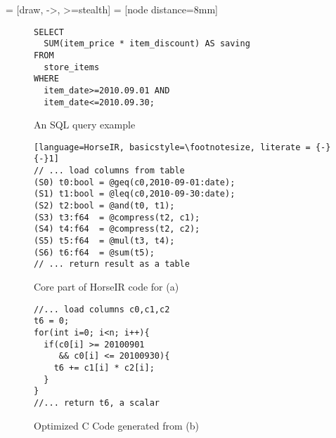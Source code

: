   = [draw, ->, >=stealth]
 = [node distance=8mm]

\begin{figure*}[htbp]

\begin{subfigure}[b]{.6\columnwidth}
\begin{lstlisting}[style=SQLStyle, basicstyle=\footnotesize]
SELECT
  SUM(item_price * item_discount) AS saving
FROM
  store_items
WHERE
  item_date>=2010.09.01 AND
  item_date<=2010.09.30;
\end{lstlisting}
\caption{An SQL query example} \label{fig:motivation_sql}
\end{subfigure}
\hfill
\begin{subfigure}[b]{.72\columnwidth}
\begin{lstlisting}[language=HorseIR, basicstyle=\footnotesize, literate = {-}{-}1]
// ... load columns from table
(S0) t0:bool = @geq(c0,2010-09-01:date);
(S1) t1:bool = @leq(c0,2010-09-30:date);
(S2) t2:bool = @and(t0, t1);
(S3) t3:f64  = @compress(t2, c1);
(S4) t4:f64  = @compress(t2, c2);
(S5) t5:f64  = @mul(t3, t4);
(S6) t6:f64  = @sum(t5);
// ... return result as a table
\end{lstlisting}
\caption{Core part of HorseIR code for (a) } \label{fig:motivation_horseir}
\end{subfigure}
\hspace{0.07\columnwidth}
\begin{subfigure}[b]{.6\columnwidth}
\centering
\begin{lstlisting}[style=CStyle, basicstyle=\footnotesize]
//... load columns c0,c1,c2
t6 = 0;
for(int i=0; i<n; i++){
  if(c0[i] >= 20100901
     && c0[i] <= 20100930){
    t6 += c1[i] * c2[i];
  }
}
//... return t6, a scalar
\end{lstlisting}
\caption{Optimized C Code generated from (b)} \label{fig:motivation_c}
\end{subfigure}
\caption{Translating an SQL query from (a) to the corresponding HorseIR code shown in (b) (with columns: c0 (item_date), c1 (item_price), and c2 (item_discount)), and generating optimized C code in (c).} \label{fig:motivation_example}
\end{figure*}
